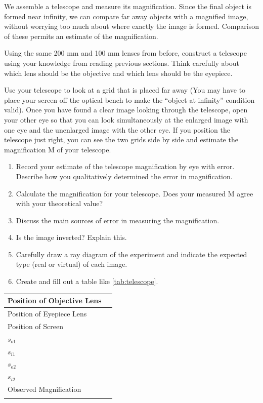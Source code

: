 We assemble a telescope and measure its magnification. Since the final object is formed near infinity, we can compare far away objects with a magnified image, without worrying too much about where exactly the image is formed. Comparison of these permits an estimate of the magnification.\myskip

Using the same 200 mm and 100 mm lenses from before, construct a telescope using your knowledge from reading previous sections. Think carefully about which lens should be the objective and which lens should be the eyepiece.\myskip

Use your telescope to look at a grid that is placed far away (You may have to place your screen off the optical bench to make the ``object at infinity'' condition valid). Once you have found a clear image looking through the telescope, open your other eye so that you can look simultaneously at the enlarged image with one eye and the unenlarged image with the other eye. If you position the telescope just right, you can see the two grids side by side and estimate the magnification M of your telescope.

\begin{enumerate}
  \item Record your estimate of the telescope magnification by eye with error. Describe how you qualitatively determined the error in magnification.

  \item Calculate the magnification for your telescope. Does your measured M agree with your theoretical value?

  \item Discuss the main sources of error in measuring the magnification.

  \item Is the image inverted? Explain this.

  \item Carefully draw a ray diagram of the experiment and indicate the expected type (real or virtual) of each image.

  \item Create and fill out a table like \ref{tab:telescope}.

\end{enumerate}

\begin{center}
\begin{tabular}{|l|l|}
\hline
Position of Objective Lens & \hspace{4 cm} \\ \hline
Position of Eyepiece Lens &                    \\ \hline
Position of Screen &                    \\ \hline
$s_{o1}$ & \\ \hline
$s_{i1}$ & \\ \hline
$s_{o2}$ & \\ \hline
$s_{i2}$ & \\ \hline
Observed Magnification & \\ \hline
\label{tab:telescope}
\end{tabular}
\end{center}

